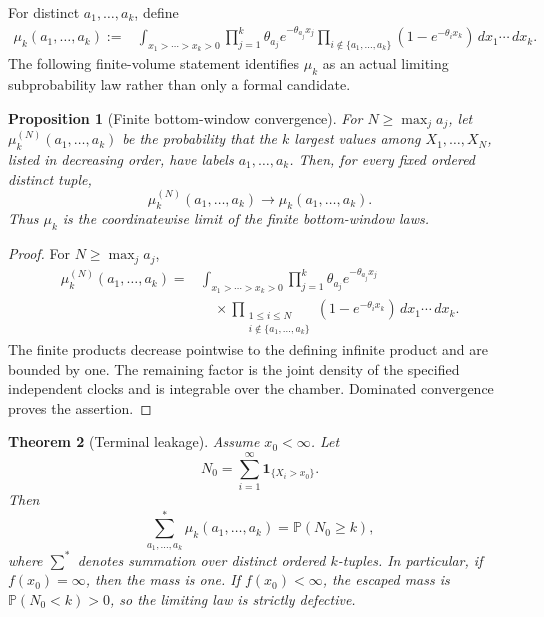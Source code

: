 \documentclass[11pt]{article}
\newtheorem{theorem}{Theorem}[section]
\newtheorem{proposition}[theorem]{Proposition}
\theoremstyle{remark}
\newcommand{\Pp}{\mathbb P}
\newcommand{\one}{\mathbf 1}
\newcommand{\dd}{\,d}
\begin{document}
For distinct \(a_1,\ldots,a_k\), define
\[
\begin{aligned}
\mu_k(a_1,\ldots,a_k)
  :=& \int_{x_1>\cdots>x_k>0}
     \prod_{j=1}^k \theta_{a_j}e^{-\theta_{a_j}x_j}
     \prod_{i\notin\{a_1,\ldots,a_k\}}
       (1-e^{-\theta_i x_k})
     \dd x_1\cdots\dd x_k .
\end{aligned}
\]
The following finite-volume statement identifies $\mu_k$ as an actual limiting
subprobability law rather than only a formal candidate.

\begin{proposition}[Finite bottom-window convergence]
\label{prop:finite-bottom-convergence}
For $N\ge\max_j a_j$, let
$\mu_k^{(N)}(a_1,\ldots,a_k)$ be the probability that the $k$ largest values
among $X_1,\ldots,X_N$, listed in decreasing order, have labels
$a_1,\ldots,a_k$.  Then, for every fixed ordered distinct tuple,
\[
        \mu_k^{(N)}(a_1,\ldots,a_k)
        \longrightarrow\mu_k(a_1,\ldots,a_k).
\]
Thus $\mu_k$ is the coordinatewise limit of the finite bottom-window laws.
\end{proposition}

\begin{proof}
For $N\ge\max_j a_j$,
\begin{align*}
\mu_k^{(N)}(a_1,\ldots,a_k)
=&\int_{x_1>\cdots>x_k>0}
 \prod_{j=1}^k\theta_{a_j}e^{-\theta_{a_j}x_j}\\
&\quad\times
 \prod_{\substack{1\le i\le N\\i\notin\{a_1,\ldots,a_k\}}}
 (1-e^{-\theta_i x_k})
 \dd x_1\cdots\dd x_k.
\end{align*}
The finite products decrease pointwise to the defining infinite product and are
bounded by one.  The remaining factor is the joint density of the specified
independent clocks and is integrable over the chamber.  Dominated convergence
proves the assertion.
\end{proof}

\begin{theorem}[Terminal leakage]\label{thm:leakage}
Assume \(x_0<\infty\).  Let
\[
        N_0=\sum_{i=1}^{\infty}\one_{\{X_i>x_0\}}.
\]
Then
\[
        \sum_{a_1,\ldots,a_k}^{*}\mu_k(a_1,\ldots,a_k)
        =\Pp(N_0\ge k),
\]
where \(\sum^*\) denotes summation over distinct ordered \(k\)-tuples.  In
particular, if \(f(x_0)=\infty\), then the mass is one.  If
\(f(x_0)<\infty\), the escaped mass is \(\Pp(N_0<k)>0\), so the limiting law
is strictly defective.
\end{theorem}
\end{document}
